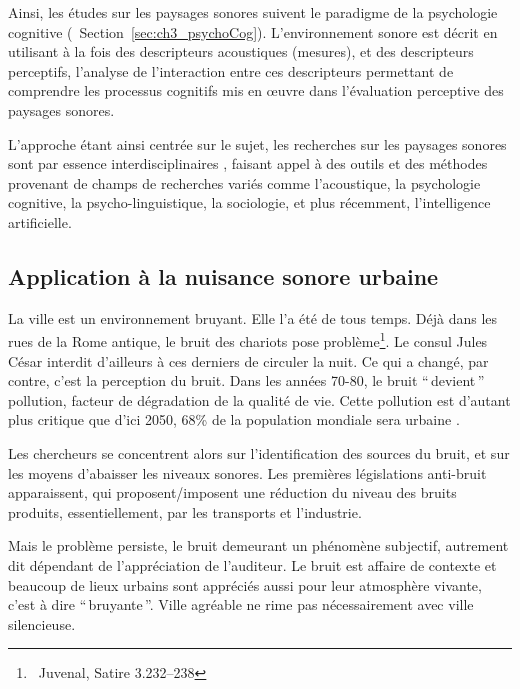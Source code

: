 Ainsi, les études sur les paysages sonores suivent le paradigme de la psychologie cognitive \citep{dubois2006cognitive,maffiolo_caracterisation_1999} (\cf~Section~\ref{sec:ch3_psychoCog}). L'environnement sonore est décrit en utilisant à la fois des descripteurs acoustiques (mesures), et des descripteurs perceptifs, l'analyse de l'interaction entre ces descripteurs permettant de comprendre les processus cognitifs mis en œuvre dans l'évaluation perceptive des paysages sonores.

L'approche étant ainsi centrée sur le sujet, les recherches sur les paysages sonores sont par essence interdisciplinaires \citep{davies2013perception,aletta2016soundscape}, faisant appel à des outils et des méthodes provenant de champs de recherches variés comme l'acoustique, la psychologie cognitive, la psycho-linguistique, la sociologie, et plus récemment, l’intelligence artificielle.

\subsection{Application à la nuisance sonore urbaine}
\label{sec:ch3_urbanNoiseSoundscape}

La ville est un environnement bruyant. Elle l'a été de tous temps. Déjà dans les rues de la Rome antique, le bruit des chariots pose problème\footnote{\cf~Juvenal, Satire 3.232–238}. Le consul Jules César interdit d'ailleurs à ces derniers de circuler la nuit. Ce qui a changé, par contre, c'est la perception du bruit. Dans les années 70-80, le bruit ``\,devient\,'' pollution, facteur de dégradation de la qualité de vie. Cette pollution est d'autant plus critique que d'ici 2050, 68\% de la population mondiale sera urbaine \citep{park14}.

Les chercheurs se concentrent alors sur l'identification des sources du bruit, et sur les moyens d'abaisser les niveaux sonores. Les premières législations anti-bruit apparaissent, qui proposent/imposent une réduction du niveau des bruits produits, essentiellement, par les transports et l'industrie.

Mais le problème persiste, le bruit demeurant un phénomène subjectif, autrement dit dépendant de l'appréciation de l'auditeur. Le bruit est affaire de contexte et beaucoup de lieux urbains sont appréciés aussi pour leur atmosphère vivante, c'est à dire ``\,bruyante\,''. Ville agréable ne rime pas nécessairement avec ville silencieuse.

